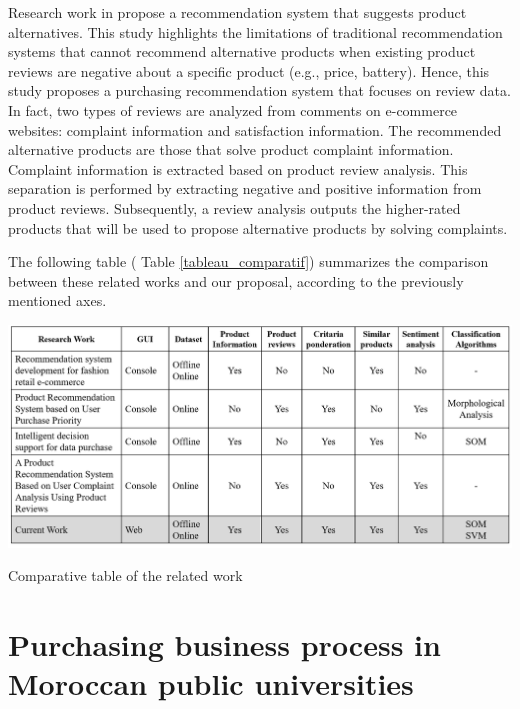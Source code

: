 \documentclass[preprint,3p,onecolumn]{elsarticle}
\begin{document}
\par Research work in \citep{yoshikawa2019product} propose a recommendation system that suggests product alternatives. This study highlights the limitations of traditional recommendation systems that cannot recommend alternative products when existing product reviews are negative about a specific product (e.g., price, battery). Hence, this study proposes a purchasing recommendation system that focuses on review data. In fact, two types of reviews are analyzed from comments on e-commerce websites: complaint information and satisfaction information. The recommended alternative products are those that solve product complaint information. Complaint information is extracted based on product review analysis. This separation is performed by extracting negative and positive information from product reviews. Subsequently, a review analysis outputs the higher-rated products that will be used to propose alternative products by solving complaints.

The following table ( Table \ref{tableau_comparatif}) summarizes the comparison between these related works and our proposal, according to the previously mentioned axes.
\begin{table}[H]
\centering
\includegraphics[scale=.4]{tableau_comparatif}
\caption{Comparative table of the related work}
\label{tableau_comparatif}
\end{table}

\section{Purchasing business process in Moroccan public universities}
\end{document}
